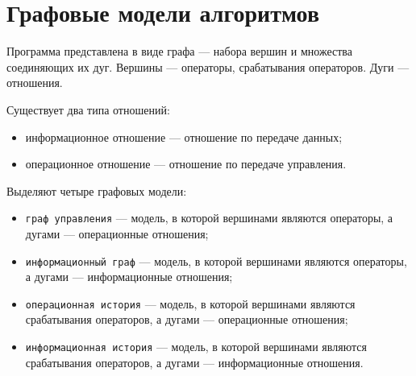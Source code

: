 \chapter{Графовые модели алгоритмов}

Программа представлена в виде графа --- набора вершин и множества соединяющих их дуг.
Вершины --- операторы, срабатывания операторов.
Дуги --- отношения.

Существует два типа отношений:

\begin{itemize}[label*=--]
	\item информационное отношение --- отношение по передаче данных;
	\item операционное отношение --- отношение по передаче управления.
\end{itemize}

Выделяют четыре  графовых модели:

\begin{itemize}[label*=--]
	\item \texttt{граф управления} --- модель, в которой вершинами являются операторы, а дугами --- операционные отношения;
	\item \texttt{информационный граф} --- модель, в которой вершинами являются операторы, а дугами --- информационные отношения;
	\item \texttt{операционная история} --- модель, в которой вершинами являются срабатывания операторов, а дугами --- операционные отношения;
	\item \texttt{информационная история} --- модель, в которой вершинами являются срабатывания операторов, а дугами --- информационные отношения.
\end{itemize}
